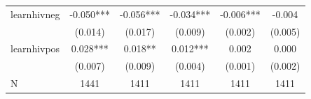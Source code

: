 \begin{tabular}{lccccc}
\hline
learnhivneg & -0.050*** & -0.056*** & -0.034*** & -0.006*** & -0.004 \\
 & (0.014) & (0.017) & (0.009) & (0.002) & (0.005) \\
learnhivpos & 0.028*** & 0.018** & 0.012*** & 0.002 & 0.000 \\
 & (0.007) & (0.009) & (0.004) & (0.001) & (0.002) \\
\hline
N & 1441 & 1411 & 1411 & 1411 & 1411 \\
\hline
\end{tabular}
